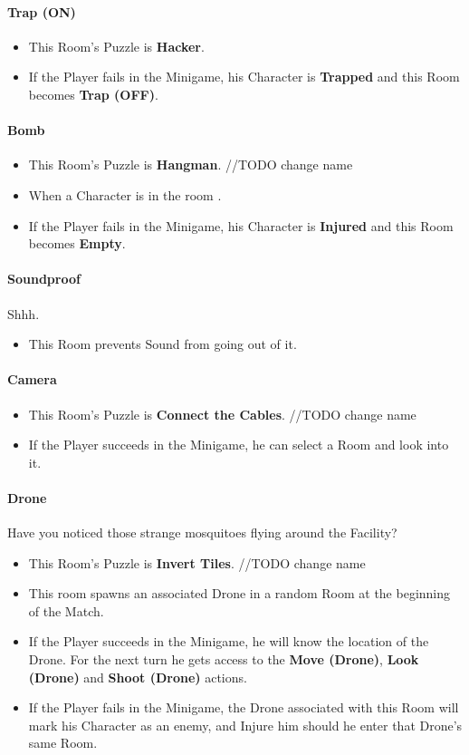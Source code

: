 \paragraph{Trap (ON)}
\begin{itemize}
	\item This Room's Puzzle is \textbf{Hacker}.
	\item If the Player fails    in the Minigame, his Character is \textbf{Trapped} and this Room becomes \textbf{Trap (OFF)}.
\end{itemize}

\paragraph{Bomb}
\begin{itemize}
	\item This Room's Puzzle is \textbf{Hangman}. //TODO change name
	\item When a Character is in the room .
	\item If the Player fails    in the Minigame, his Character is \textbf{Injured} and this Room becomes \textbf{Empty}.
\end{itemize}

\paragraph{Soundproof} Shhh.
\begin{itemize}
	\item This Room prevents Sound from going out of it.
\end{itemize}

\paragraph{Camera} 
\begin{itemize}
	\item This Room's Puzzle is \textbf{Connect the Cables}. //TODO change name
	\item If the Player succeeds in the Minigame, he can select a Room and look into it.
\end{itemize}

\paragraph{Drone} Have you noticed those strange mosquitoes flying around the Facility?
\begin{itemize}
	\item This Room's Puzzle is \textbf{Invert Tiles}. //TODO change name
	\item This room spawns an associated Drone in a random Room at the beginning of the Match.
	\item If the Player succeeds in the Minigame, he will know the location of the Drone. For the next turn he gets access to the \textbf{Move (Drone)}, \textbf{Look (Drone)} and \textbf{Shoot (Drone)} actions.
	\item If the Player fails    in the Minigame, the Drone associated with this Room will mark his Character as an enemy, and Injure him should he enter that Drone's same Room.
\end{itemize}

